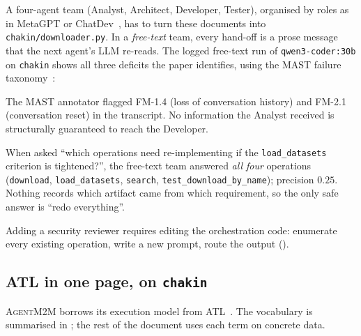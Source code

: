 \documentclass[10pt,a4paper]{article}
\newcommand{\tool}{\textsc{AgentM2M}}
\newcommand{\code}[1]{\texttt{#1}}
\newcommand{\file}[1]{\texttt{#1}}
\theoremstyle{definition}
\begin{document}
A four-agent team (Analyst, Architect, Developer, Tester), organised by roles as in
MetaGPT or ChatDev~\cite{hong2024metagpt,qian2024chatdev}, has to turn these
documents into \file{chakin/downloader.py}. In a \emph{free-text} team, every
hand-off is a prose message that the next agent's LLM re-reads. The logged
free-text run of \texttt{qwen3-coder:30b} on \texttt{chakin} shows all three
deficits the paper identifies, using the MAST failure taxonomy~\cite{cemri2025mast}:

\begin{description}[leftmargin=1.2em, style=nextline]
\item[P1, lossy hand-offs.] The MAST annotator flagged FM-1.4 (loss of
conversation history) and FM-2.1 (conversation reset) in the transcript. No
information the Analyst received is structurally guaranteed to reach the
Developer.
\item[P2, no traceability under change.] When asked ``which operations need
re-implementing if the \code{load_datasets} criterion is tightened?'', the
free-text team answered \emph{all four} operations
(\code{download}, \code{load_datasets}, \code{search},
\code{test_download_by_name}); precision $0.25$. Nothing records which
artifact came from which requirement, so the only safe answer is ``redo
everything''.
\item[P3, structure lives in prompts.] Adding a security reviewer requires
editing the orchestration code: enumerate every existing operation, write a
new prompt, route the output ().
\end{description}

\subsection{ATL in one page, on \texttt{chakin}}

\tool{} borrows its execution model from ATL~\cite{jouault2008atl}. The
vocabulary is summarised in ; the rest of the document
uses each term on concrete data.
\end{document}
